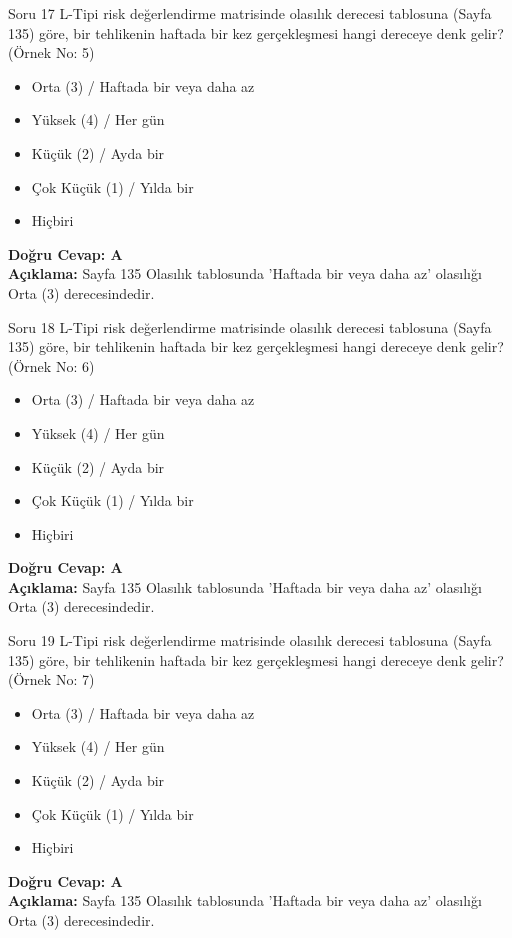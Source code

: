 \documentclass[12pt,a4paper]{article}
\begin{document}
\begin{testcard}{Soru 17}
    L-Tipi risk değerlendirme matrisinde olasılık derecesi tablosuna (Sayfa 135) göre, bir tehlikenin haftada bir kez gerçekleşmesi hangi dereceye denk gelir? (Örnek No: 5)
    \begin{itemize}
        \item[A)] Orta (3) / Haftada bir veya daha az
        \item[B)] Yüksek (4) / Her gün
        \item[C)] Küçük (2) / Ayda bir
        \item[D)] Çok Küçük (1) / Yılda bir
        \item[E)] Hiçbiri
    \end{itemize}
    \tcblower
    \textbf{Doğru Cevap: A} \\
    \textbf{Açıklama:} Sayfa 135 Olasılık tablosunda 'Haftada bir veya daha az' olasılığı Orta (3) derecesindedir.
\end{testcard}

\begin{testcard}{Soru 18}
    L-Tipi risk değerlendirme matrisinde olasılık derecesi tablosuna (Sayfa 135) göre, bir tehlikenin haftada bir kez gerçekleşmesi hangi dereceye denk gelir? (Örnek No: 6)
    \begin{itemize}
        \item[A)] Orta (3) / Haftada bir veya daha az
        \item[B)] Yüksek (4) / Her gün
        \item[C)] Küçük (2) / Ayda bir
        \item[D)] Çok Küçük (1) / Yılda bir
        \item[E)] Hiçbiri
    \end{itemize}
    \tcblower
    \textbf{Doğru Cevap: A} \\
    \textbf{Açıklama:} Sayfa 135 Olasılık tablosunda 'Haftada bir veya daha az' olasılığı Orta (3) derecesindedir.
\end{testcard}

\begin{testcard}{Soru 19}
    L-Tipi risk değerlendirme matrisinde olasılık derecesi tablosuna (Sayfa 135) göre, bir tehlikenin haftada bir kez gerçekleşmesi hangi dereceye denk gelir? (Örnek No: 7)
    \begin{itemize}
        \item[A)] Orta (3) / Haftada bir veya daha az
        \item[B)] Yüksek (4) / Her gün
        \item[C)] Küçük (2) / Ayda bir
        \item[D)] Çok Küçük (1) / Yılda bir
        \item[E)] Hiçbiri
    \end{itemize}
    \tcblower
    \textbf{Doğru Cevap: A} \\
    \textbf{Açıklama:} Sayfa 135 Olasılık tablosunda 'Haftada bir veya daha az' olasılığı Orta (3) derecesindedir.
\end{testcard}
\end{document}
